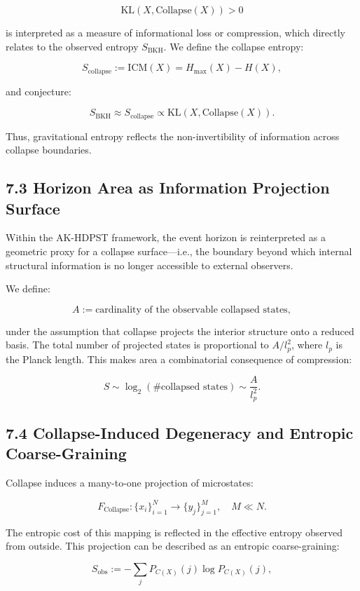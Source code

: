 \documentclass[11pt]{article}
\begin{document}
\[
\mathrm{KL}(X, \mathrm{Collapse}(X)) > 0
\]

is interpreted as a measure of informational loss or compression, which directly relates to the observed entropy \( S_{\mathrm{BKH}} \). We define the collapse entropy:

\[
S_{\mathrm{collapse}} := \mathrm{ICM}(X) = H_{\max}(X) - H(X),
\]

and conjecture:

\[
S_{\mathrm{BKH}} \approx S_{\mathrm{collapse}} \propto \mathrm{KL}(X, \mathrm{Collapse}(X)).
\]

Thus, gravitational entropy reflects the non-invertibility of information across collapse boundaries.

\subsection*{7.3 Horizon Area as Information Projection Surface}

Within the AK-HDPST framework, the event horizon is reinterpreted as a geometric proxy for a collapse surface—i.e., the boundary beyond which internal structural information is no longer accessible to external observers.

We define:

\[
A := \text{cardinality of the observable collapsed states},
\]

under the assumption that collapse projects the interior structure onto a reduced basis. The total number of projected states is proportional to \( A / l_p^2 \), where \( l_p \) is the Planck length. This makes area a combinatorial consequence of compression:

\[
S \sim \log_2(\# \text{collapsed states}) \sim \frac{A}{l_p^2}.
\]

\subsection*{7.4 Collapse-Induced Degeneracy and Entropic Coarse-Graining}

Collapse induces a many-to-one projection of microstates:

\[
F_{\mathrm{Collapse}} : \{ x_i \}_{i=1}^N \to \{ y_j \}_{j=1}^M, \quad M \ll N.
\]

The entropic cost of this mapping is reflected in the effective entropy observed from outside. This projection can be described as an entropic coarse-graining:

\[
S_{\mathrm{obs}} := - \sum_j P_{C(X)}(j) \log P_{C(X)}(j),
\]
\end{document}
